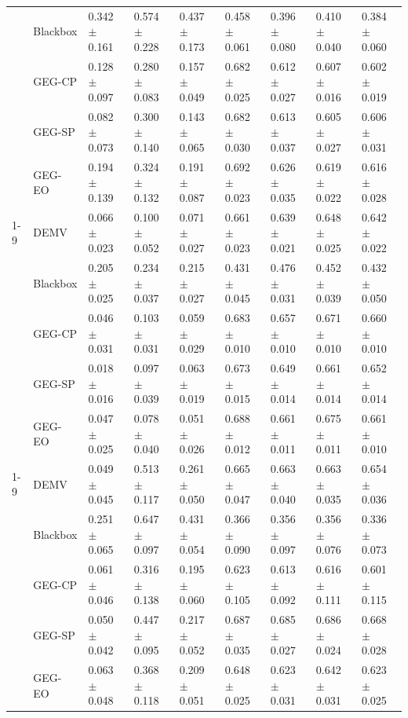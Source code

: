 \begin{table}
\begin{tabular}{lllllllll}
 & Blackbox & 0.342 $\pm$ 0.161 & 0.574 $\pm$ 0.228 & 0.437 $\pm$ 0.173 & 0.458 $\pm$ 0.061 & 0.396 $\pm$ 0.080 & 0.410 $\pm$ 0.040 & 0.384 $\pm$ 0.060 \\
 & GEG-CP & 0.128 $\pm$ 0.097 & 0.280 $\pm$ 0.083 & 0.157 $\pm$ 0.049 & 0.682 $\pm$ 0.025 & 0.612 $\pm$ 0.027 & 0.607 $\pm$ 0.016 & 0.602 $\pm$ 0.019 \\
 & GEG-SP & 0.082 $\pm$ 0.073 & 0.300 $\pm$ 0.140 & 0.143 $\pm$ 0.065 & 0.682 $\pm$ 0.030 & 0.613 $\pm$ 0.037 & 0.605 $\pm$ 0.027 & 0.606 $\pm$ 0.031 \\
 & GEG-EO & 0.194 $\pm$ 0.139 & 0.324 $\pm$ 0.132 & 0.191 $\pm$ 0.087 & 0.692 $\pm$ 0.023 & 0.626 $\pm$ 0.035 & 0.619 $\pm$ 0.022 & 0.616 $\pm$ 0.028 \\
\cline{1-9}
\multirow[t]{5}{*}{law} & DEMV & 0.066 $\pm$ 0.023 & 0.100 $\pm$ 0.052 & 0.071 $\pm$ 0.027 & 0.661 $\pm$ 0.023 & 0.639 $\pm$ 0.021 & 0.648 $\pm$ 0.025 & 0.642 $\pm$ 0.022 \\
 & Blackbox & 0.205 $\pm$ 0.025 & 0.234 $\pm$ 0.037 & 0.215 $\pm$ 0.027 & 0.431 $\pm$ 0.045 & 0.476 $\pm$ 0.031 & 0.452 $\pm$ 0.039 & 0.432 $\pm$ 0.050 \\
 & GEG-CP & 0.046 $\pm$ 0.031 & 0.103 $\pm$ 0.031 & 0.059 $\pm$ 0.029 & 0.683 $\pm$ 0.010 & 0.657 $\pm$ 0.010 & 0.671 $\pm$ 0.010 & 0.660 $\pm$ 0.010 \\
 & GEG-SP & 0.018 $\pm$ 0.016 & 0.097 $\pm$ 0.039 & 0.063 $\pm$ 0.019 & 0.673 $\pm$ 0.015 & 0.649 $\pm$ 0.014 & 0.661 $\pm$ 0.014 & 0.652 $\pm$ 0.014 \\
 & GEG-EO & 0.047 $\pm$ 0.025 & 0.078 $\pm$ 0.040 & 0.051 $\pm$ 0.026 & 0.688 $\pm$ 0.012 & 0.661 $\pm$ 0.011 & 0.675 $\pm$ 0.011 & 0.661 $\pm$ 0.010 \\
\cline{1-9}
\multirow[t]{5}{*}{obesity} & DEMV & 0.049 $\pm$ 0.045 & 0.513 $\pm$ 0.117 & 0.261 $\pm$ 0.050 & 0.665 $\pm$ 0.047 & 0.663 $\pm$ 0.040 & 0.663 $\pm$ 0.035 & 0.654 $\pm$ 0.036 \\
 & Blackbox & 0.251 $\pm$ 0.065 & 0.647 $\pm$ 0.097 & 0.431 $\pm$ 0.054 & 0.366 $\pm$ 0.090 & 0.356 $\pm$ 0.097 & 0.356 $\pm$ 0.076 & 0.336 $\pm$ 0.073 \\
 & GEG-CP & 0.061 $\pm$ 0.046 & 0.316 $\pm$ 0.138 & 0.195 $\pm$ 0.060 & 0.623 $\pm$ 0.105 & 0.613 $\pm$ 0.092 & 0.616 $\pm$ 0.111 & 0.601 $\pm$ 0.115 \\
 & GEG-SP & 0.050 $\pm$ 0.042 & 0.447 $\pm$ 0.095 & 0.217 $\pm$ 0.052 & 0.687 $\pm$ 0.035 & 0.685 $\pm$ 0.027 & 0.686 $\pm$ 0.024 & 0.668 $\pm$ 0.028 \\
 & GEG-EO & 0.063 $\pm$ 0.048 & 0.368 $\pm$ 0.118 & 0.209 $\pm$ 0.051 & 0.648 $\pm$ 0.025 & 0.623 $\pm$ 0.031 & 0.642 $\pm$ 0.031 & 0.623 $\pm$ 0.025 \\

\end{tabular}
\end{table}
